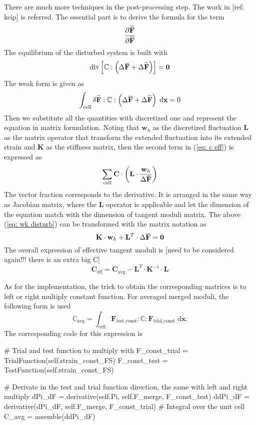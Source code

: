 \documentclass[10pt,a4paper]{scrreprt}
\newcommand{\myd}{\;\mathrm{d}}
\newcommand{\overbar}[1]{\mkern 1.5mu\overline{\mkern-1.5mu#1\mkern-1.5mu}\mkern 1.5mu}
\begin{document}
There are much more techniques in the post-processing step. The work in [ref: keip] is referred. The essential part is to derive the formula for the term 
\[
\dfrac{\partial \widetilde{\mathbf{F}}}{\partial \overbar{\mathbf{F}}}
\]
The equilibrium of the disturbed system is built with
\[
\text{div} \left[ \mathbb{C} : \left( \Delta \overbar{\mathbf{F}} + \Delta \widetilde{\mathbf{F}} \right) \right] = \mathbf{0}
\]
The weak form is given as
\begin{equation}
\label{eq: wk disturb}
\int_{\text{cell}} \delta \widetilde{\mathbf{F}} : \mathbb{C} : \left( \Delta \overbar{\mathbf{F}} + \Delta \widetilde{\mathbf{F}} \right) \myd{\mathbf{x}} = 0
\end{equation}
Then we substitute all the quantities with discretized one and represent the equation in matrix formulation. Noting that $\mathbf{w}_{h}$ as the discretized fluctuation $\mathbf{L}$ as the matrix operator that transform the extended fluctuation into its extended strain and $\mathbf{K}$ as the stiffness matrix, then the second term in (\ref{eq: c eff}) is expressed as
\begin{equation}
\sum_{\text{cell}} \mathbf{C} \cdot \left( \mathbf{L} \cdot \dfrac{\mathbf{w}_{h}}{\Delta \overbar{\mathbf{F}}} \right)
\end{equation}
The vector fraction corresponds to the derivative. It is arranged in the same way as Jacobian matrix, where the $\mathbf{L}$ operator is applicable and let the dimension of the equation match with the dimension of tangent moduli matrix. The above (\ref{eq: wk disturb}) can be transformed with the matrix notation as
\begin{equation}
\mathbf{K} \cdot \mathbf{w}_{h} + \mathbf{L}^{T} \cdot \Delta \overbar{\mathbf{F}} = \mathbf{0}
\end{equation}
The overall expression of effective tangent moduli is [need to be considered again!!! there is an extra big C]
\begin{equation}
\mathbf{C}_{\text{eff}} = \mathbf{C}_{\text{avg}} - \mathbf{L}^{T} \cdot \mathbf{K}^{-1} \cdot \mathbf{L}
\end{equation}

As for the implementation, the trick to obtain the corresponding matrices is to left or right multiply constant function. For averaged merged moduli, the following form is used
\begin{equation}
\mathbb{C}_{\text{avg}} = \int_{\text{cell}} \mathbf{F}_{\text{test\_const}}: \mathbb{C} : \mathbf{F}_{\text{trial\_const}} \myd{\mathbf{x}}.
\end{equation}
The corresponding code for this expression is 
\begin{python}
# Trial and test function to multiply with
F_const_trial = TrialFunction(self.strain_const_FS)
F_const_test = TestFunction(self.strain_const_FS)

# Derivate in the test and trial function direction, the same with left and right multiply
dPi_dF = derivative(self.Pi, self.F_merge, F_const_test)
ddPi_dF = derivative(dPi_dF, self.F_merge, F_const_trial)
# Integral over the unit cell
C_avg = assemble(ddPi_dF)
\end{python}
\end{document}
